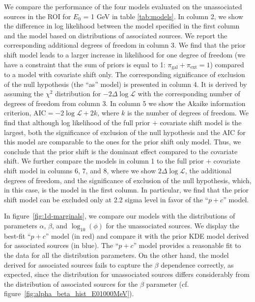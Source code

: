 \documentclass[12pt, a4paper]{article}
\begin{document}
We compare the performance of the four models evaluated on the unassociated sources in the ROI for $E_0$ = 1 GeV in table \ref{tab:models}.
In column 2, we show the difference in log likelihood between the model specified in the first column and the model based on distributions of associated sources.
We report the corresponding additional degrees of freedom in column 3.
We find that the prior shift model leads to a larger increase in likelihood for one degree of freedom (we have a constraint that the sum of priors is equal to 1: $\pi_\textrm{gal} + \pi_\textrm{ext} =1$) compared to a model with covariate shift only.
The corresponding significance of exclusion of the null hypothesis (the ``as'' model) is presented in column 4.
It is derived by assuming the $\chi^2$ distribution for $-2\Delta \log \mathcal{L}$ with the corresponding number of degrees of freedom from column 3.
In column 5 we show the Akaike information criterion, $\textrm{AIC} = -2\log\mathcal{L} + 2 k$, where $k$ is the number of degrees of freedom.
We find that although log likelihood of the full prior $+$ covariate shift model is the largest,
both the significance of exclusion of the null hypothesis and the AIC for this model are comparable to the ones for the prior shift only model.
Thus, we conclude that the prior shift is the dominant effect compared to the covariate shift.
We further compare the models in column 1 to the full prior $+$ covariate shift model in columns 6, 7, and 8, where we show $2\Delta \log \mathcal{L}$, the additional degrees of freedom, and the significance of exclusion of the null hypothesis, which, in this case, is the model in the first column.
In particular, we find that the prior shift model can be excluded only at 2.2 sigma level in favor of the ``$p + c$'' model.


In figure~\ref{fig:1d-marginals},
we compare our models with the distributions of parameters $\alpha$, $\beta$, and $\log_{10}(\phi)$ for the unassociated sources. 
We display the best-fit ``$p+c$'' model (in red) and compare it with the prior KDE model derived for associated sources (in blue).
The ``$p+c$'' model provides a reasonable fit to the data for all the distribution parameters. On the other hand, the model derived for associated sources fails to capture the $\beta$ dependence correctly, as expected, since the distribution for unassociated sources differs considerably from the distribution of associated sources for the $\beta$ parameter (cf. figure~\ref{fig:alpha_beta_hist_E01000MeV}). 
\end{document}
